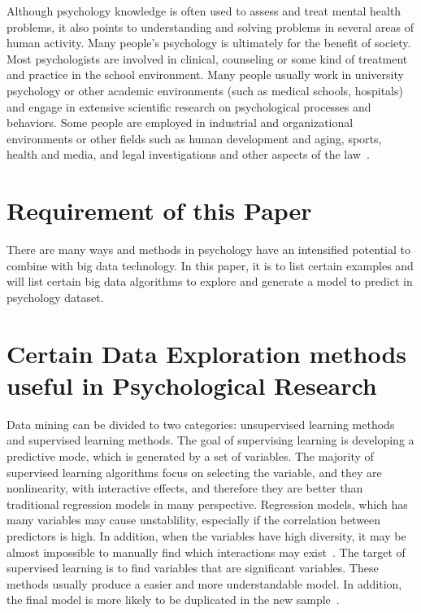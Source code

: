 Although psychology knowledge is often used to assess and treat 
mental health problems, it also points to understanding and solving
problems in several areas of human activity. Many people's 
psychology
 is ultimately for the benefit of society. Most psychologists are 
involved in clinical, counseling or some kind of treatment and 
practice in the school environment. Many people usually work in 
university psychology or other academic environments (such as medical
 schools, hospitals) and engage in extensive scientific research on
 psychological processes and behaviors. Some people are employed in
 industrial and organizational environments or other fields such as
 human development and aging, sports, health and media, and 
legal investigations and other aspects of the law~\cite{hid515-19}.

\section{Requirement of this Paper}
There are many ways and methods in psychology have an intensified 
potential to combine with big data technology. In this paper, it is to
 list certain examples and will list certain big data algorithms to 
explore and generate a model to predict in psychology dataset. 

\section{Certain Data Exploration methods 
useful in Psychological Research}

Data mining can be divided to two categories: 
unsupervised learning methods and supervised learning methods. The
 goal of supervising learning is developing a predictive mode, 
which is generated by a set of variables. The majority of 
supervised learning algorithms focus on selecting the variable, 
and they are nonlinearity, with interactive effects, 
and therefore they are better than traditional regression models in
many perspective. Regression models, which has many variables may 
cause unstablility, especially if the correlation between predictors 
is high. In addition, 
when the variables have high diversity, it may be almost impossible
 to manually find which interactions may exist~\cite{hid515-11}. 
The target of 
supervised learning is to find variables that are 
significant variables. 
These methods usually produce a easier and more 
understandable model. 
In addition, the final model is more likely to be duplicated in the
 new sample~\cite{hid515-11}.

